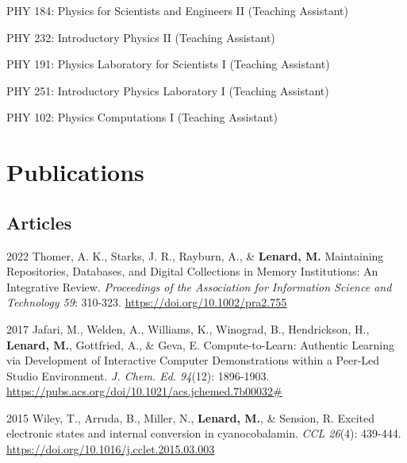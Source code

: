 \documentclass[12pt,letterpaper]{report}
\newcommand{\listitemspace}{0.25em}
\renewenvironment{itemize}
{\begin{list}{}{\setlength{\leftmargin}{0em}
            \setlength{\parskip}{0em}
            \setlength{\itemsep}{\listitemspace}
            \setlength{\parsep}{\listitemspace}}}
{\end{list}}
\begin{document}
\begin{itemize}

        \item PHY 184: Physics for Scientists and Engineers II (Teaching Assistant)
        
        \item PHY 232: Introductory Physics II (Teaching Assistant)
        
        \item PHY 191: Physics Laboratory for Scientists I (Teaching Assistant)
        
        \item PHY 251: Introductory Physics Laboratory I (Teaching Assistant)
        
        \item PHY 102: Physics Computations I (Teaching Assistant)

\end{itemize}



\section*{Publications}

\subsection*{Articles}

\begin{tablist}
   
        \item[2022] \tab Thomer, A. K., Starks, J. R., Rayburn, A., \& \textbf{Lenard, M.} Maintaining Repositories, Databases, and Digital Collections in Memory Institutions: An Integrative Review. \textit{Proceedings of the Association for Information Science and Technology 59}: 310-323. \href{https://doi.org/10.1002/pra2.755}{https://doi.org/10.1002/pra2.755}
        
        \item[2017] \tab Jafari, M., Welden, A., Williams, K., Winograd, B., Hendrickson, H., \textbf{Lenard, M.}, Gottfried, A., \& Geva, E. Compute-to-Learn: Authentic Learning via Development of Interactive Computer Demonstrations within a Peer-Led Studio Environment. \textit{J. Chem. Ed. 94}(12): 1896-1903. \href{https://pubs.acs.org/doi/10.1021/acs.jchemed.7b00032\#}{https://pubs.acs.org/doi/10.1021/acs.jchemed.7b00032\#}

        \item[2015] \tab Wiley, T., Arruda, B., Miller, N., \textbf{Lenard, M.}, \& Sension, R. Excited electronic states and internal conversion in cyanocobalamin. \textit{CCL 26}(4): 439-444. \href{https://doi.org/10.1016/j.cclet.2015.03.003}{https://doi.org/10.1016/j.cclet.2015.03.003}

\end{tablist}
\end{document}
